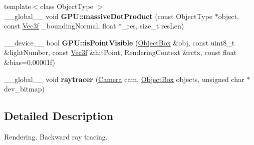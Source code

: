\begin{DoxyCompactItemize}
\item 
{\footnotesize template$<$class Object\+Type $>$ }\\\+\_\+\+\_\+global\+\_\+\+\_\+ void {\bfseries G\+P\+U\+::massive\+Dot\+Product} (const Object\+Type $\ast$object, const \hyperlink{class_vec3}{Vec3f} \+\_\+bounding\+Normal, float $\ast$\+\_\+res, size\+\_\+t res\+Len)\hypertarget{r_t_tracer_2include_2rendering_8cuh_a25d7b057a4233ea0016c486e951f7946}{}\label{r_t_tracer_2include_2rendering_8cuh_a25d7b057a4233ea0016c486e951f7946}

\item 
\+\_\+\+\_\+device\+\_\+\+\_\+ bool {\bfseries G\+P\+U\+::is\+Point\+Visible} (\hyperlink{class_object_box}{Object\+Box} \&obj, const uint8\+\_\+t \&light\+Number, const \hyperlink{class_vec3}{Vec3f} \&hit\+Point, Rendering\+Context \&rctx, const float \&bias=0.\+00001f)\hypertarget{r_t_tracer_2include_2rendering_8cuh_adcb3e0c7119489d0f49d385c771df604}{}\label{r_t_tracer_2include_2rendering_8cuh_adcb3e0c7119489d0f49d385c771df604}

\item 
\+\_\+\+\_\+global\+\_\+\+\_\+ void {\bfseries raytracer} (\hyperlink{struct_camera}{Camera} cam, \hyperlink{class_object_box}{Object\+Box} objects, unsigned char $\ast$dev\+\_\+bitmap)
\end{DoxyCompactItemize}


\subsection{Detailed Description}
Rendering. Backward ray tracing. 

